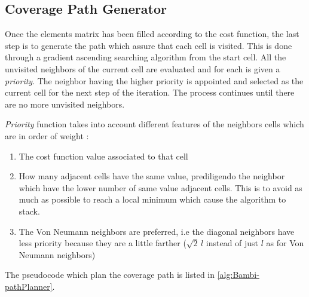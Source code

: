 \subsection{Coverage Path Generator} %
\label{sub:coverage_path_generator}
Once the elements matrix has been filled according to the cost function, the last step is to generate the path which assure that each cell is visited. This is done through a gradient ascending searching algorithm from the start cell. All the unvisited neighbors of the current cell are evaluated and for each is given a \textit{priority}. The neighbor having the higher priority is appointed and selected as the current cell for the next step of the iteration. The process continues until there are no more unvisited neighbors.\par
\textit{Priority} function takes into account different features of the neighbors cells which are in order of weight :
\begin{enumerate}
	\item The cost function value associated to that cell
	\item How many adjacent cells have the same value, prediligendo the neighbor which have the lower number of same value adjacent cells. This is to avoid as much as possible to reach a local minimum which cause the algorithm to stack.
	\item The Von Neumann neighbors are preferred, i.e the diagonal neighbors have less priority because they are a little farther ($\sqrt{2}\,l$ instead of just $l$ as for Von Neumann neighbors)
\end{enumerate}
The pseudocode which plan the coverage path is listed in \autoref{alg:Bambi-pathPlanner}.
